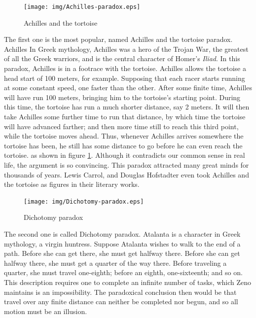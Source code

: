 \documentclass{article}
\begin{document}
\begin{figure}[htbp]
 \centering
 \texttt{[image: img/Achilles-paradox.eps]}
 \caption{Achilles and the tortoise}
 \label{fig:Achilles-paradox}
\end{figure}

The first one is the most popular, named Achilles and the tortoise paradox. Achilles In Greek mythology, Achilles was a hero of the Trojan War, the greatest of all the Greek warriors, and is the central character of Homer's {\em Iliad}. In this paradox, Achilles is in a footrace with the tortoise. Achilles allows the tortoise a head start of 100 meters, for example. Supposing that each racer starts running at some constant speed, one faster than the other. After some finite time, Achilles will have run 100 meters, bringing him to the tortoise's starting point. During this time, the tortoise has run a much shorter distance, say 2 meters. It will then take Achilles some further time to run that distance, by which time the tortoise will have advanced farther; and then more time still to reach this third point, while the tortoise moves ahead. Thus, whenever Achilles arrives somewhere the tortoise has been, he still has some distance to go before he can even reach the tortoise. as shown in figure \ref{fig:Achilles-paradox}. Although it contradicts our common sense in real life, the argument is so convincing. This paradox attracted many great minds for thousands of years. Lewis Carrol, and Douglas Hofstadter even took Achilles and the tortoise as figures in their literary works.

\begin{figure}[htbp]
 \centering
 \texttt{[image: img/Dichotomy-paradox.eps]}
 \caption{Dichotomy paradox}
 \label{fig:Dichotomy-paradox}
\end{figure}

The second one is called Dichotomy paradox. Atalanta is a character in Greek mythology, a virgin huntress. Suppose Atalanta wishes to walk to the end of a path. Before she can get there, she must get halfway there. Before she can get halfway there, she must get a quarter of the way there. Before traveling a quarter, she must travel one-eighth; before an eighth, one-sixteenth; and so on. This description requires one to complete an infinite number of tasks, which Zeno maintains is an impossibility. The paradoxical conclusion then would be that travel over any finite distance can neither be completed nor begun, and so all motion must be an illusion.
\end{document}
